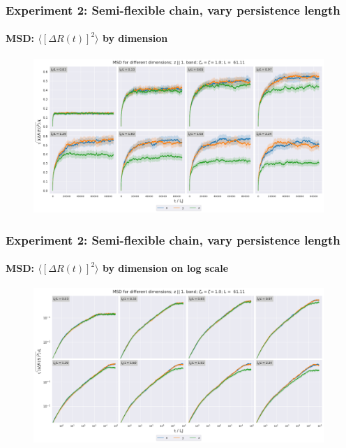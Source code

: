 \documentclass[handout]{beamer}
\newcommand{\mean}[1]{\langle #1 \rangle}
\begin{document}
\begin{frame}
    \frametitle{Experiment 2: Semi-flexible chain, vary persistence length}
    \framesubtitle{MSD: $\mean{[\Delta R(t)]^2}$ by dimension}

    \begin{figure}[h]
        \includegraphics[width=11cm]{./4-exp-msd_by_dim.png}
    \end{figure}
\end{frame}

\begin{frame}
    \frametitle{Experiment 2: Semi-flexible chain, vary persistence length}
    \framesubtitle{MSD: $\mean{[\Delta R(t)]^2}$ by dimension on log scale}

    \begin{figure}[h]
        \includegraphics[width=11cm]{./4-exp-msd_by_dim-log.png}
    \end{figure}
\end{frame}
\end{document}

